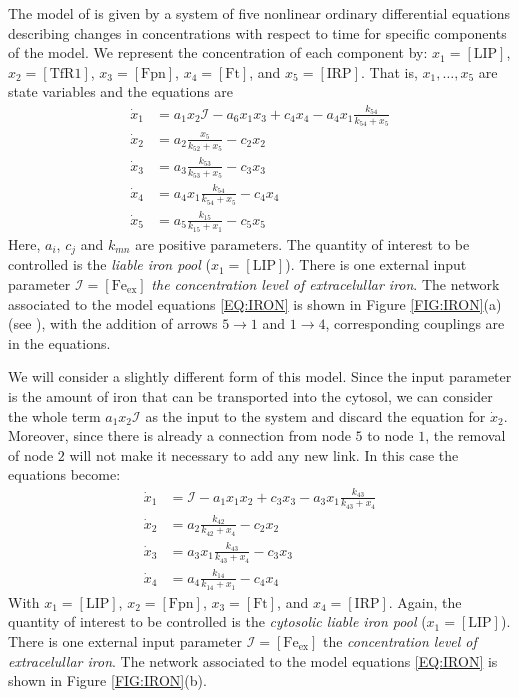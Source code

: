 \documentclass[a4paper,fleqn]{cas-dc}
\begin{document}
The model of \cite{chifman2012} is given by a system of five nonlinear ordinary differential equations describing changes in concentrations with respect to time for specific components of the model.
We represent the concentration of each component by: $x_1=[\mathrm{LIP}]$, $x_2=[\mathrm{TfR1}]$, $x_3=[\mathrm{Fpn}]$, $x_4=[\mathrm{Ft}]$, and $x_5=[\mathrm{IRP}]$. 
That is, $x_1,\ldots,x_5$ are state variables and the equations are
\begin{equation} \label{EQ:IRON}
\begin{aligned}
\dot{x}_1 & = a_1 x_2 \mathcal{I} - a_6 x_1 x_3 + c_4 x_4 - a_4 x_1 \frac{k_{54}}{k_{54}+x_5} \\
\dot{x}_2 & = a_2 \frac{x_5}{k_{52}+x_5} - c_2 x_2 \\
\dot{x}_3 & = a_3 \frac{k_{53}}{k_{53}+x_5} - c_3 x_3 \\
\dot{x}_4 & = a_4  x_1 \frac{k_{54}}{k_{54}+x_5} - c_4 x_4 \\
\dot{x}_5 & = a_5 \frac{k_{15}}{k_{15}+x_1} - c_5 x_5
\end{aligned}
\end{equation}
Here, $a_i$, $c_j$ and $k_{mn}$ are positive parameters.
The quantity of interest to be controlled is the \emph{liable iron pool} ($x_1=[\mathrm{LIP}]$). 
There is one external input parameter $\mathcal{I} =[\mathrm{Fe_{ex}}]$ \emph{the concentration level of extracelullar iron}.
The network associated to the model equations \eqref{EQ:IRON} is shown in Figure \ref{FIG:IRON}(a) (see \cite[Fig. 1]{chifman2012}), with the addition of arrows $5 \to 1$ and $1 \to 4$, corresponding couplings are in the equations.

We will consider a slightly different form of this model.
Since the input parameter is the amount of iron that can be transported into the cytosol, we can consider the whole term $a_1 x_2 \mathcal{I}$ as the input to the system and discard the equation for $\dot{x}_2$.
Moreover, since there is already a connection from node $5$ to node $1$, the removal of node $2$ will not make it necessary to add any new link.
In this case the equations become:
\begin{equation} \label{EQ:IRON_NEW}
\begin{aligned}
\dot{x}_1 & = \mathcal{I} - a_1 x_1 x_2 + c_3 x_3 - a_3 x_1 \frac{k_{43}}{k_{43}+x_4} \\
\dot{x}_2 & = a_2 \frac{k_{42}}{k_{42}+x_4} - c_2 x_2 \\
\dot{x}_3 & = a_3  x_1 \frac{k_{43}}{k_{43}+x_4} - c_3 x_3 \\
\dot{x}_4 & = a_4 \frac{k_{14}}{k_{14}+x_1} - c_4 x_4
\end{aligned}
\end{equation}
With $x_1=[\mathrm{LIP}]$, $x_2=[\mathrm{Fpn}]$, $x_3=[\mathrm{Ft}]$, and $x_4=[\mathrm{IRP}]$.
Again, the quantity of interest to be controlled is the \emph{cytosolic liable iron pool} ($x_1=[\mathrm{LIP}]$). 
There is one external input parameter $\mathcal{I} =[\mathrm{Fe_{ex}}]$ the \emph{concentration level of extracelullar iron}.
The network associated to the model equations \eqref{EQ:IRON} is shown in Figure \ref{FIG:IRON}(b). 
\end{document}
